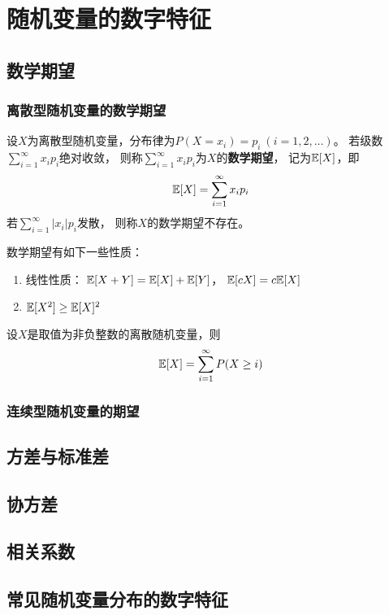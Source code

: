 \chapter{随机变量的数字特征}

\section{数学期望}

\subsection{离散型随机变量的数学期望}
\begin{definition}[离散型随机变量的数学期望]
  设$X$为离散型随机变量，分布律为$P(X=x_i)=p_i\ (i=1,2,\dots)$。
  若级数$\sum_{i=1}^{\infty}x_ip_i$绝对收敛，
  则称$\sum_{i=1}^{\infty}x_ip_i$为$X$的\textbf{数学期望}，
  记为$\mathbb{E}[X]$，即
  \begin{displaymath}
    \mathbb{E}[X] = \sum_{i=1}^{\infty}x_ip_i
  \end{displaymath}
  若$\sum_{i=1}^{\infty}|x_i|p_i$发散，
  则称$X$的数学期望不存在。
\end{definition}

\begin{theorem}[性质]
  数学期望有如下一些性质：
  \begin{enumerate}
    \item 线性性质：
    $\mathbb{E}[X+Y] = \mathbb{E}[X] + \mathbb{E}[Y]$，
    $\mathbb{E}[cX] = c\mathbb{E}[X]$
    \item 
    $\mathbb{E}[X^2] \ge \mathbb{E}[X]^2$  
  \end{enumerate}
\end{theorem}

\begin{theorem}[离散非负随机变量的期望的其它计算方法]
  设$X$是取值为非负整数的离散随机变量，则
  \begin{displaymath}
    \mathbb{E}[X] = \sum_{i=1}^{\infty} P(X\ge i)
  \end{displaymath}
\end{theorem}

\subsection{连续型随机变量的期望}

\section{方差与标准差}

\section{协方差}

\section{相关系数}

\section{常见随机变量分布的数字特征}